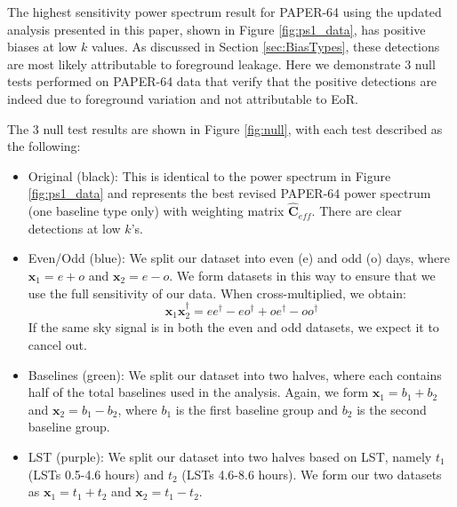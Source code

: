 \documentclass[preprint2,numberedappendix,tighten]{aastex6}  %
\begin{document}
The highest sensitivity power spectrum result for PAPER-64 using the updated analysis presented in this paper, shown in 
Figure \ref{fig:ps1_data}, has positive biases at low $k$ values. As discussed in Section \ref{sec:BiasTypes}, these detections 
are most likely attributable to foreground leakage. Here we demonstrate $3$ null tests performed on PAPER-64 data that verify 
that the positive detections are indeed due to foreground variation and not attributable to EoR.

The $3$ null test results are shown in Figure \ref{fig:null}, with each test described as the following:

\begin{itemize}
\item Original (black): This is identical to the power spectrum in Figure \ref{fig:ps1_data} and represents the best revised 
PAPER-64 power spectrum (one baseline type only) with weighting matrix $\hat{\textbf{C}}_{eff}$. There are clear detections at 
low $k$'s.
\item Even/Odd (blue): We split our dataset into even (e) and odd (o) days, where $\textbf{x}_{1} = e + o$ and $\textbf{x}_{2} = 
e - o$. We form datasets in this way to ensure that we use the full sensitivity of our data. When cross-multiplied, we obtain:
\begin{equation}
\textbf{x}_{1}\textbf{x}_{2}^{\dagger} = ee^{\dagger} - eo^{\dagger} + oe^{\dagger} - oo^{\dagger}
\end{equation}
If the same sky signal is in both the even and odd datasets, we expect it to cancel out.
\item Baselines (green): We split our dataset into two halves, where each contains half of the total baselines used in the 
analysis. Again, we form $\textbf{x}_{1} = b_{1} + b_{2}$ and $\textbf{x}_{2} = b_{1} - b_{2}$, where $b_{1}$ is the first baseline 
group and $b_{2}$ is the second baseline group.
\item LST (purple): We split our dataset into two halves based on LST, namely $t_{1}$ (LSTs 0.5-4.6 hours) and $t_{2}$ (LSTs 
4.6-8.6 hours). We form our two datasets as $\textbf{x}_{1} = t_{1} + t_{2}$ and $\textbf{x}_{2} = t_{1} - t_{2}$.
\end{itemize}
\end{document}
